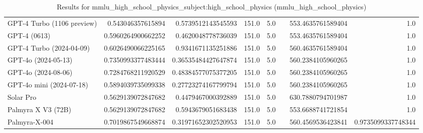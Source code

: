 \begin{table}[htp]
{\begin{tabular}{lrrrrrrr}
GPT-4 Turbo (1106 preview) & 0.543046357615894 & 0.5739512143545593 & 151.0 & 5.0 &  & 553.4635761589404 & 1.0 \\
GPT-4 (0613) & 0.5960264900662252 & 0.4620048778736039 & 151.0 & 5.0 &  & 553.4635761589404 & 1.0 \\
GPT-4 Turbo (2024-04-09) & 0.6026490066225165 & 0.9341671135251886 & 151.0 & 5.0 &  & 560.4635761589404 & 1.0 \\
GPT-4o (2024-05-13) & 0.7350993377483444 & 0.36535484427647874 & 151.0 & 5.0 &  & 560.2384105960265 & 1.0 \\
GPT-4o (2024-08-06) & 0.7284768211920529 & 0.48384577075377205 & 151.0 & 5.0 &  & 560.2384105960265 & 1.0 \\
GPT-4o mini (2024-07-18) & 0.5894039735099338 & 0.27723274167799794 & 151.0 & 5.0 &  & 560.2384105960265 & 1.0 \\
Solar Pro & 0.5629139072847682 & 0.4479467000392889 & 151.0 & 5.0 &  & 630.7880794701987 & 1.0 \\
Palmyra X V3 (72B) & 0.5629139072847682 & 0.5943679051683438 & 151.0 & 5.0 &  & 553.6688741721854 & 1.0 \\
Palmyra-X-004 & 0.7019867549668874 & 0.31971652302520953 & 151.0 & 5.0 &  & 560.4569536423841 & 0.9735099337748344 \\
\bottomrule
\end{tabular}}
\caption{Results for mmlu_high_school_physics_subject:high_school_physics (mmlu_high_school_physics)}
\label{fig:mmlu_high_school_physics_subject:high_school_physics (mmlu_high_school_physics)}
\end{table}